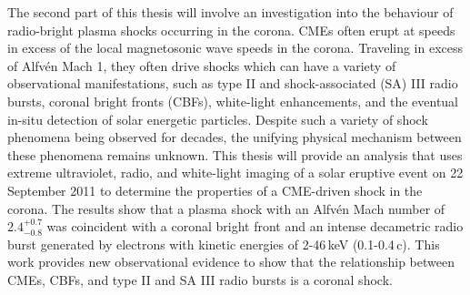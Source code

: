 \begin{abstracts}
The second part of this thesis will involve an investigation into the behaviour of radio-bright plasma shocks occurring in the corona. CMEs often erupt at speeds in excess of the local magnetosonic wave speeds in the corona. Traveling in excess of Alfv\'{e}n Mach 1, they often drive shocks which can have a variety of observational manifestations, such as type II and {\color{blue} shock-associated (SA)} III radio bursts, coronal bright fronts (CBFs), white-light enhancements, and the eventual in-situ detection of solar energetic particles. Despite such a variety of shock phenomena being observed for decades, the unifying physical mechanism between these phenomena remains unknown. This thesis will provide an analysis that uses extreme ultraviolet, radio, and white-light imaging of a solar eruptive event on 22 September 2011 to determine the properties of a CME-driven shock in the corona. The results show that a plasma shock with an Alfv\'{e}n Mach number of $2.4^{+0.7}_{-0.8}$ was coincident with a coronal bright front and an intense decametric radio burst generated by electrons with kinetic energies of 2-46\,keV (0.1-0.4\,c). This work provides new observational evidence to show that the relationship between CMEs, CBFs, and type II and {\color{blue} SA} III radio bursts is a coronal shock. 



\end{abstracts}


